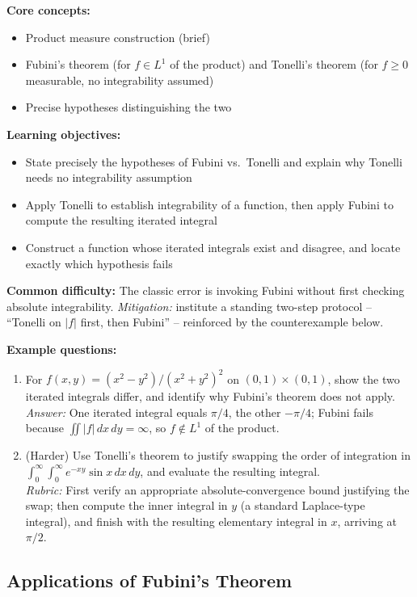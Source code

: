 \documentclass[11pt]{article}
\begin{document}
\textbf{Core concepts:}
\begin{itemize}[nosep]
\item Product measure construction (brief)
\item Fubini's theorem (for $f\in L^1$ of the product) and Tonelli's theorem (for $f\ge0$ measurable, no integrability assumed)
\item Precise hypotheses distinguishing the two
\end{itemize}

\textbf{Learning objectives:}
\begin{itemize}[nosep]
\item State precisely the hypotheses of Fubini vs.\ Tonelli and explain why Tonelli needs no integrability assumption
\item Apply Tonelli to establish integrability of a function, then apply Fubini to compute the resulting iterated integral
\item Construct a function whose iterated integrals exist and disagree, and locate exactly which hypothesis fails
\end{itemize}

\textbf{Common difficulty:} The classic error is invoking Fubini without first checking absolute integrability. \textit{Mitigation:} institute a standing two-step protocol -- ``Tonelli on $|f|$ first, then Fubini'' -- reinforced by the counterexample below.

\textbf{Example questions:}
\begin{enumerate}[nosep]
\item For $f(x,y)=(x^2-y^2)/(x^2+y^2)^2$ on $(0,1)\times(0,1)$, show the two iterated integrals differ, and identify why Fubini's theorem does not apply. \\
\textit{Answer:} One iterated integral equals $\pi/4$, the other $-\pi/4$; Fubini fails because $\iint|f|\,dx\,dy=\infty$, so $f\notin L^1$ of the product.
\item (Harder) Use Tonelli's theorem to justify swapping the order of integration in $\int_0^\infty\int_0^\infty e^{-xy}\sin x\,dx\,dy$, and evaluate the resulting integral. \\
\textit{Rubric:} First verify an appropriate absolute-convergence bound justifying the swap; then compute the inner integral in $y$ (a standard Laplace-type integral), and finish with the resulting elementary integral in $x$, arriving at $\pi/2$.
\end{enumerate}

\subsection{Applications of Fubini's Theorem}
\end{document}
